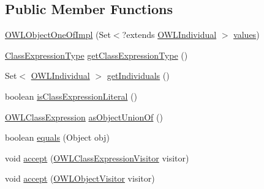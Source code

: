 \subsection*{Public Member Functions}
\begin{DoxyCompactItemize}
\item 
\hyperlink{classuk_1_1ac_1_1manchester_1_1cs_1_1owl_1_1owlapi_1_1_o_w_l_object_one_of_impl_a6ea2d4820b5cefc4e5b6186d1a390fd7}{O\-W\-L\-Object\-One\-Of\-Impl} (Set$<$?extends \hyperlink{interfaceorg_1_1semanticweb_1_1owlapi_1_1model_1_1_o_w_l_individual}{O\-W\-L\-Individual} $>$ \hyperlink{classuk_1_1ac_1_1manchester_1_1cs_1_1owl_1_1owlapi_1_1_o_w_l_object_one_of_impl_a168bc7c45fa11bd10943672559a09bba}{values})
\item 
\hyperlink{enumorg_1_1semanticweb_1_1owlapi_1_1model_1_1_class_expression_type}{Class\-Expression\-Type} \hyperlink{classuk_1_1ac_1_1manchester_1_1cs_1_1owl_1_1owlapi_1_1_o_w_l_object_one_of_impl_a0ca38d215b3c3a52fe9013c1f6b2a090}{get\-Class\-Expression\-Type} ()
\item 
Set$<$ \hyperlink{interfaceorg_1_1semanticweb_1_1owlapi_1_1model_1_1_o_w_l_individual}{O\-W\-L\-Individual} $>$ \hyperlink{classuk_1_1ac_1_1manchester_1_1cs_1_1owl_1_1owlapi_1_1_o_w_l_object_one_of_impl_af5e4991012bce7bfad70835c3e0fdc6b}{get\-Individuals} ()
\item 
boolean \hyperlink{classuk_1_1ac_1_1manchester_1_1cs_1_1owl_1_1owlapi_1_1_o_w_l_object_one_of_impl_aa196fbb06a4ff78f109c2a3d45099962}{is\-Class\-Expression\-Literal} ()
\item 
\hyperlink{interfaceorg_1_1semanticweb_1_1owlapi_1_1model_1_1_o_w_l_class_expression}{O\-W\-L\-Class\-Expression} \hyperlink{classuk_1_1ac_1_1manchester_1_1cs_1_1owl_1_1owlapi_1_1_o_w_l_object_one_of_impl_a53c85635fa98638a9e1d5e226d0ebdac}{as\-Object\-Union\-Of} ()
\item 
boolean \hyperlink{classuk_1_1ac_1_1manchester_1_1cs_1_1owl_1_1owlapi_1_1_o_w_l_object_one_of_impl_a76ac8a984121bbd5631e425d95a5d076}{equals} (Object obj)
\item 
void \hyperlink{classuk_1_1ac_1_1manchester_1_1cs_1_1owl_1_1owlapi_1_1_o_w_l_object_one_of_impl_ac9eb336aedca2b2d272e8cc0b5de217d}{accept} (\hyperlink{interfaceorg_1_1semanticweb_1_1owlapi_1_1model_1_1_o_w_l_class_expression_visitor}{O\-W\-L\-Class\-Expression\-Visitor} visitor)
\item 
void \hyperlink{classuk_1_1ac_1_1manchester_1_1cs_1_1owl_1_1owlapi_1_1_o_w_l_object_one_of_impl_adda44c12fd749c789b8ed7d83366cdfc}{accept} (\hyperlink{interfaceorg_1_1semanticweb_1_1owlapi_1_1model_1_1_o_w_l_object_visitor}{O\-W\-L\-Object\-Visitor} visitor)
\end{DoxyCompactItemize}
